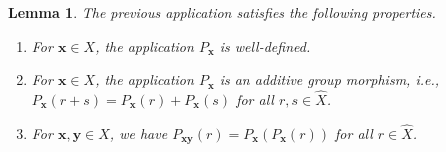 \documentclass[10pt,a4paper]{amsart}
\newtheorem{lemma}{Lemma}
\begin{document}
\begin{lemma}
    \label{lem:props_Px}
The previous application satisfies the following properties.
\begin{enumerate}
\item For $\mathbf{x}\in X$,  the application $P_\mathbf{x}$ is well-defined. 
\item For $\mathbf{x}\in X$,  the application $P_\mathbf{x}$ is an additive group morphism,  i.e., $P_\mathbf{x} (r + s) = P_\mathbf{x}(r) + P_\mathbf{x}(s)$ for all $r,s \in \widehat X$.
\item For $\mathbf{x}, \mathbf{y} \in X$,  we have $P_{\mathbf{x}\mathbf{y}}(r) = P_\mathbf{x}(P_\mathbf{x}(r))$ for all $r\in \widehat X$.
\end{enumerate}
\end{lemma}
\end{document}
